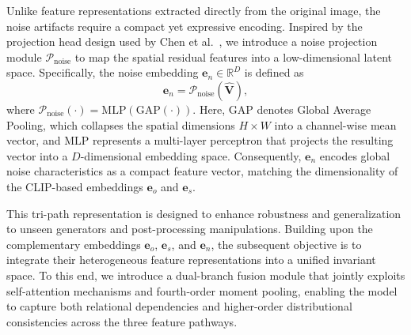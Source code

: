 \documentclass[letterpaper,twocolumn,10pt]{article}
\newcommand{\bm}[1]{\mathbf{#1}} %
\begin{document}
Unlike feature representations extracted directly from the original image, the noise artifacts require a compact yet expressive encoding. Inspired by the projection head design used by Chen et al.~\cite{Chen2020SimCLR}, we introduce a noise projection module $\mathcal{P}_{\text{noise}}$ to map the spatial residual features into a low-dimensional latent space. Specifically, the noise embedding $\bm{e}_n \in \mathbb{R}^{D}$ is defined as
\begin{equation}
	\bm{e}_n = \mathcal{P}_{\text{noise}}(\hat{\bm{V}}),
\end{equation}
where $\mathcal{P}_{\mathrm{noise}}(\cdot) = \mathrm{MLP}(\text{GAP}(\cdot))$. Here, $\mathrm{GAP}$ denotes Global Average Pooling, which collapses the spatial dimensions $H \times W$ into a channel-wise mean vector, and $\mathrm{MLP}$ represents a multi-layer perceptron that projects the resulting vector into a $D$-dimensional embedding space. Consequently, $\bm{e}_n$ encodes global noise characteristics as a compact feature vector, matching the dimensionality of the CLIP-based embeddings $\bm{e}_o$ and $\bm{e}_s$.

This tri-path representation is designed to enhance robustness and generalization to unseen generators and post-processing manipulations. Building upon the complementary embeddings $\bm{e}_o$, $\bm{e}_s$, and $\bm{e}_n$, the subsequent objective is to integrate their heterogeneous feature representations into a unified invariant space. To this end, we introduce a dual-branch fusion module that jointly exploits self-attention mechanisms and fourth-order moment pooling, enabling the model to capture both relational dependencies and higher-order distributional consistencies across the three feature pathways.
\end{document}
